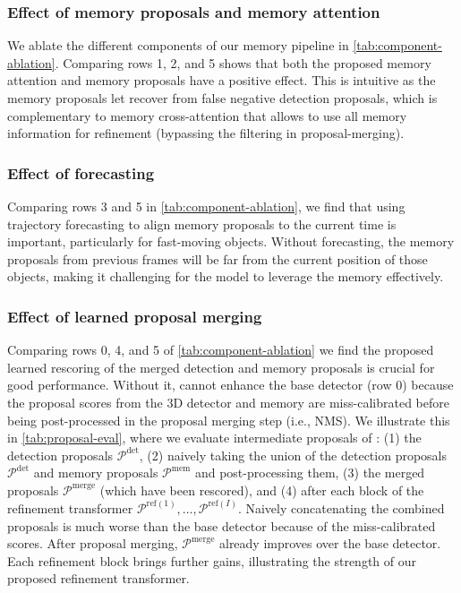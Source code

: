\subsubsection{Effect of memory proposals and memory attention}
We ablate the different components of our memory pipeline in \cref{tab:component-ablation}.
Comparing rows 1, 2, and 5 shows that both the proposed memory attention and memory proposals have a positive effect.
This is intuitive as the memory proposals let \ourmodel{} recover from false negative detection proposals, which is complementary to memory cross-attention that allows \ourmodel{} to use all memory information for refinement (bypassing the filtering in proposal-merging). 

\subsubsection{Effect of forecasting}
Comparing rows 3 and 5 in \cref{tab:component-ablation}, we find that using trajectory forecasting to align memory proposals to the current time is important, particularly for fast-moving objects.
Without forecasting, the memory proposals from previous frames
will be far from the current position of those objects, making it challenging for the model to leverage the memory effectively.

\subsubsection{Effect of learned proposal merging}
Comparing rows 0, 4, and 5 of \cref{tab:component-ablation} we find the proposed learned rescoring of the merged detection and memory proposals is crucial for good performance.
Without it, \ourmodel{} cannot enhance the base detector (row 0) because the proposal scores from the 3D detector and memory are miss-calibrated before being post-processed in the proposal merging step (i.e., NMS).
We illustrate this in \cref{tab:proposal-eval}, where we evaluate intermediate proposals of \ourmodel{}:
(1) the detection proposals $\mathcal{P}^\mathrm{det}$,
(2) naively taking the union of the detection proposals $\mathcal{P}^\mathrm{det}$ and memory proposals $\mathcal{P}^\mathrm{mem}$ and post-processing them, %
(3) the merged proposals $\mathcal{P}^\mathrm{merge}$ (which have been rescored), and
(4) after each block of the refinement transformer $\mathcal{P}^{\mathrm{ref}(1)}, \dots, \mathcal{P}^{\mathrm{ref}(I)}$.
Naively concatenating the combined proposals is much worse than the base detector because of the miss-calibrated scores.
After proposal merging, $\mathcal{P}^\mathrm{merge}$ already improves over the base detector.
Each refinement block brings further gains, illustrating the strength of our proposed refinement transformer.

